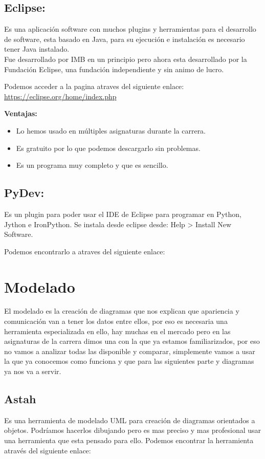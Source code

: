 \subsection{Eclipse:}
Es una aplicación software con muchos plugins y herramientas para el desarrollo de software, esta basado en Java, para su ejecución e instalación es necesario tener Java instalado.\\
Fue desarrollado por IMB en un principio pero ahora esta desarrollado por la Fundación Eclipse, una fundación independiente y sin animo de lucro.


Podemos acceder a la pagina atraves del siguiente enlace: \url{https://eclipse.org/home/index.php}

\textbf{Ventajas:}
\begin{itemize}
	\item Lo hemos usado en múltiples asignaturas durante la carrera.
	\item Es gratuito por lo que podemos descargarlo sin problemas.
	\item Es un programa muy completo y que es sencillo.
\end{itemize}

\subsection{PyDev:}
Es un plugin para poder usar el IDE de Eclipse para programar en Python, Jython e IronPython.
Se instala desde eclipse desde: Help > Install New Software.

Podemos encontrarlo a atraves del siguiente enlace:\cite{Eclipse:PyDev}

\section{Modelado}
El modelado es la creación de diagramas que nos explican que apariencia y comunicación van a tener los datos entre ellos, por eso es necesaria una herramienta especializada en ello, hay muchas en el mercado pero en las asignaturas de la carrera dimos una con la que ya estamos familiarizados, por eso no vamos a analizar todas las disponible y comparar, simplemente vamos a usar la que ya conocemos como funciona y que para las siguientes parte y diagramas ya nos va a servir.

\subsection{Astah}
Es una herramienta de modelado UML para creación de diagramas orientados a objetos.
Podríamos hacerlos dibujando pero es mas preciso y mas profesional usar una herramienta que esta pensado para ello.
Podemos encontrar la herramienta através del siguiente enlace: \cite{Modelado:Astah}

